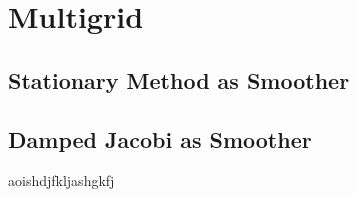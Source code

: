 \documentclass{amsart}
\theoremstyle{definition}
\theoremstyle{remark}
\numberwithin{equation}{section}
\begin{document}

\section{Multigrid}


\subsection{Stationary Method as Smoother}


\subsection{Damped Jacobi as Smoother}
aoishdjfkljashgkfj
\end{document}
